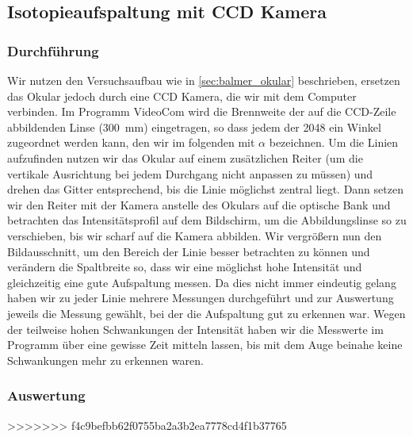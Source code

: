 \documentclass[11pt, a4paper]{article}
\numberwithin{equation}{section}
\begin{document}
\subsection{Isotopieaufspaltung mit CCD Kamera}

\subsubsection{Durchführung}

Wir nutzen den Versuchsaufbau wie in \ref{sec:balmer_okular} beschrieben, ersetzen das Okular jedoch durch eine CCD Kamera, die wir mit dem Computer verbinden.
Im Programm VideoCom wird die Brennweite der auf die CCD-Zeile abbildenden Linse (\SI{300}{\milli\meter}) eingetragen, so dass jedem der 2048 ein Winkel zugeordnet werden kann, den wir im folgenden mit $\alpha$ bezeichnen.
Um die Linien aufzufinden nutzen wir das Okular auf einem zusätzlichen Reiter (um die vertikale Ausrichtung bei jedem Durchgang nicht anpassen zu müssen) und drehen das Gitter entsprechend, bis die Linie möglichst zentral liegt.
Dann setzen wir den Reiter mit der Kamera anstelle des Okulars auf die optische Bank und betrachten das Intensitätsprofil auf dem Bildschirm, um die Abbildungslinse so zu verschieben, bis wir scharf auf die Kamera abbilden.
Wir vergrößern nun den Bildausschnitt, um den Bereich der Linie besser betrachten zu können und verändern die Spaltbreite so, dass wir eine möglichst hohe Intensität und gleichzeitig eine gute Aufspaltung messen.
Da dies nicht immer eindeutig gelang haben wir zu jeder Linie mehrere Messungen durchgeführt und zur Auswertung jeweils die Messung gewählt, bei der die Aufspaltung gut zu erkennen war.
Wegen der teilweise hohen Schwankungen der Intensität haben wir die Messwerte im Programm über eine gewisse Zeit mitteln lassen, bis mit dem Auge beinahe keine Schwankungen mehr zu erkennen waren.

\subsubsection{Auswertung}
>>>>>>> f4c9befbb62f0755ba2a3b2ea7778cd4f1b37765
\end{document}
